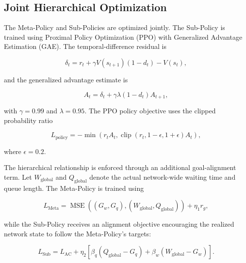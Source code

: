 \documentclass[3p,times]{elsarticle}
\theoremstyle{plain}
\theoremstyle{definition}
\begin{document}

\subsection{Joint Hierarchical Optimization}\label{subsec3-8}

The Meta-Policy and Sub-Policies are optimized jointly. The Sub-Policy
is trained using Proximal Policy Optimization (PPO) with Generalized
Advantage Estimation (GAE). The temporal-difference residual is

\begin{equation}
\delta_t = r_t + \gamma V(s_{t+1})(1 - d_t) - V(s_t),
\end{equation}

and the generalized advantage estimate is

\begin{equation}
A_t = \delta_t + \gamma\lambda(1 - d_t)A_{t+1},
\end{equation}

with $\gamma = 0.99$ and $\lambda = 0.95$. The PPO policy objective
uses the clipped probability ratio

\begin{equation}
L_{\text{policy}} = -\min\left(r_tA_t,
\operatorname{clip}(r_t, 1-\epsilon, 1+\epsilon)A_t\right),
\end{equation}

where $\epsilon = 0.2$.

The hierarchical relationship is enforced through an additional
goal-alignment term. Let $W_{\mathrm{global}}$ and $Q_{\mathrm{global}}$
denote the actual network-wide waiting time and queue length. The
Meta-Policy is trained using

\begin{equation}
L_{\mathrm{Meta}} = \operatorname{MSE}\!\left((G_w, G_q),
(W_{\mathrm{global}}, Q_{\mathrm{global}})\right) + \eta_1 r_g,
\end{equation}

while the Sub-Policy receives an alignment objective encouraging the
realized network state to follow the Meta-Policy's targets:

\begin{equation}
L_{\mathrm{Sub}} = L_{\mathrm{AC}} + \eta_2 \left[
\beta_q(Q_{\mathrm{global}} - G_q) +
\beta_w(W_{\mathrm{global}} - G_w)\right].
\end{equation}
\end{document}
